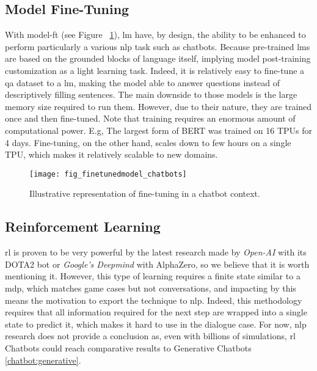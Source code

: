 \subsection{Model Fine-Tuning}
\label{chatbot:finetuning}
With \gls{model-ft} (see Figure ~\ref{fig:fig_finetunedmodel_chatbots}), \gls{lm} have, by design, the ability to be enhanced to perform particularly a various \gls{nlp} task such as chatbots. Because pre-trained \glspl{lm} are based on the grounded blocks of language itself, implying model post-training customization as a light learning task. Indeed, it is relatively easy to fine-tune a \gls{qa} dataset to a \gls{lm}, making the model able to answer questions instead of descriptively filling sentences. The main downside to those models is the large memory size required to run them. However, due to their nature, they are trained once and then fine-tuned. Note that training requires an enormous amount of computational power. E.g, The largest form of BERT \autocite{paper:devlin-etal-2019-bert} was trained on 16 TPUs for 4 days. Fine-tuning, on the other hand, scales down to few hours on a single TPU, which makes it relatively scalable to new domains.

\begin{figure}[H]
    \centering
    \texttt{[image: fig\_finetunedmodel\_chatbots]}
    \caption{Illustrative representation of fine-tuning in a chatbot context.}
    \label{fig:fig_finetunedmodel_chatbots}
\end{figure}

\subsection{Reinforcement Learning}
\gls{rl} is proven to be very powerful by the latest research made by \textit{Open-AI} with its DOTA2 bot or \textit{Google's Deepmind} with AlphaZero, so we believe that it is worth mentioning it. However, this type of learning requires a finite state similar to a \gls{mdp}, which matches game cases but not conversations, and impacting by this means the motivation to export the technique to \gls{nlp}. Indeed, this methodology requires that all information required for the next step are wrapped into a single state to predict it, which makes it hard to use in the dialogue case. For now, \gls{nlp} research does not provide a conclusion as, even with billions of simulations, \gls{rl} Chatbots could reach comparative results to Generative Chatbots \ref{chatbot:generative}.

